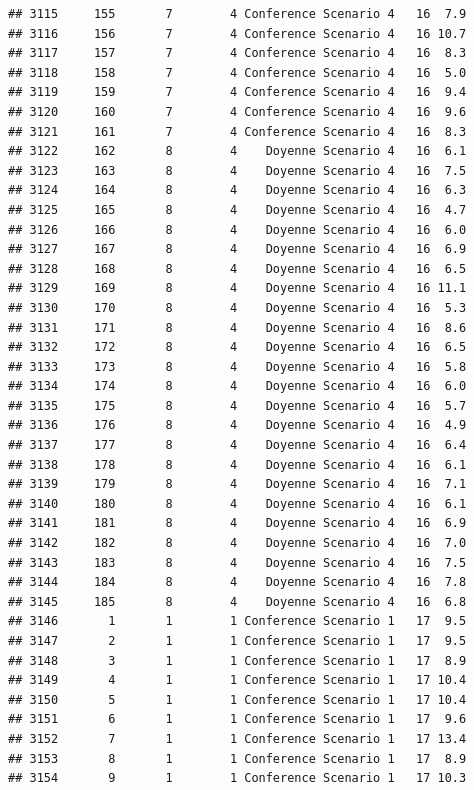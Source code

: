 \documentclass[
]{article}
\begin{document}
\begin{verbatim}
## 3115     155       7        4 Conference Scenario 4   16  7.9
## 3116     156       7        4 Conference Scenario 4   16 10.7
## 3117     157       7        4 Conference Scenario 4   16  8.3
## 3118     158       7        4 Conference Scenario 4   16  5.0
## 3119     159       7        4 Conference Scenario 4   16  9.4
## 3120     160       7        4 Conference Scenario 4   16  9.6
## 3121     161       7        4 Conference Scenario 4   16  8.3
## 3122     162       8        4    Doyenne Scenario 4   16  6.1
## 3123     163       8        4    Doyenne Scenario 4   16  7.5
## 3124     164       8        4    Doyenne Scenario 4   16  6.3
## 3125     165       8        4    Doyenne Scenario 4   16  4.7
## 3126     166       8        4    Doyenne Scenario 4   16  6.0
## 3127     167       8        4    Doyenne Scenario 4   16  6.9
## 3128     168       8        4    Doyenne Scenario 4   16  6.5
## 3129     169       8        4    Doyenne Scenario 4   16 11.1
## 3130     170       8        4    Doyenne Scenario 4   16  5.3
## 3131     171       8        4    Doyenne Scenario 4   16  8.6
## 3132     172       8        4    Doyenne Scenario 4   16  6.5
## 3133     173       8        4    Doyenne Scenario 4   16  5.8
## 3134     174       8        4    Doyenne Scenario 4   16  6.0
## 3135     175       8        4    Doyenne Scenario 4   16  5.7
## 3136     176       8        4    Doyenne Scenario 4   16  4.9
## 3137     177       8        4    Doyenne Scenario 4   16  6.4
## 3138     178       8        4    Doyenne Scenario 4   16  6.1
## 3139     179       8        4    Doyenne Scenario 4   16  7.1
## 3140     180       8        4    Doyenne Scenario 4   16  6.1
## 3141     181       8        4    Doyenne Scenario 4   16  6.9
## 3142     182       8        4    Doyenne Scenario 4   16  7.0
## 3143     183       8        4    Doyenne Scenario 4   16  7.5
## 3144     184       8        4    Doyenne Scenario 4   16  7.8
## 3145     185       8        4    Doyenne Scenario 4   16  6.8
## 3146       1       1        1 Conference Scenario 1   17  9.5
## 3147       2       1        1 Conference Scenario 1   17  9.5
## 3148       3       1        1 Conference Scenario 1   17  8.9
## 3149       4       1        1 Conference Scenario 1   17 10.4
## 3150       5       1        1 Conference Scenario 1   17 10.4
## 3151       6       1        1 Conference Scenario 1   17  9.6
## 3152       7       1        1 Conference Scenario 1   17 13.4
## 3153       8       1        1 Conference Scenario 1   17  8.9
## 3154       9       1        1 Conference Scenario 1   17 10.3

\end{verbatim}
\end{document}
